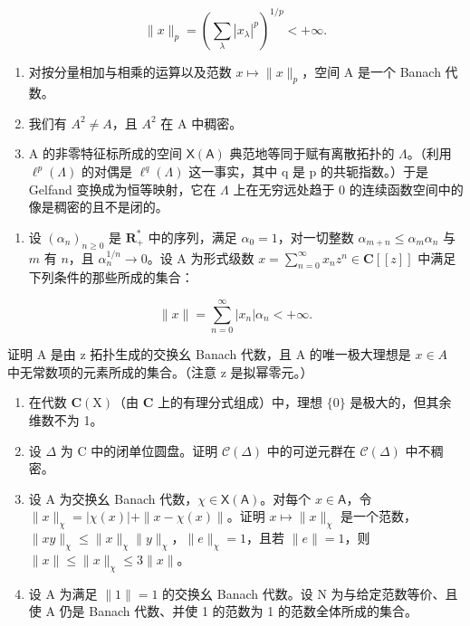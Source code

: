 \[
\| x \| _ {p} = \left(\sum_ {\lambda} | x _ {\lambda} | ^ {p}\right) ^ {1 / p} <   + \infty .
\]

\begin{enumerate}
\def\labelenumi{\alph{enumi})}
\item
  对按分量相加与相乘的运算以及范数 \(x \mapsto \| x \|_p\)，空间 A 是一个 Banach 代数。
\item
  我们有 \(A^{2} \neq A\)，且 \(A^{2}\) 在 A 中稠密。
\item
  A 的非零特征标所成的空间 \(\mathsf{X}(\mathsf{A})\) 典范地等同于赋有离散拓扑的 \(\Lambda\)。（利用 \(\ell^{p}(\Lambda)\) 的对偶是 \(\ell^{q}(\Lambda)\) 这一事实，其中 q 是 p 的共轭指数。）于是 Gelfand 变换成为恒等映射，它在 \(\Lambda\) 上在无穷远处趋于 0 的连续函数空间中的像是稠密的且不是闭的。
\end{enumerate}

\begin{enumerate}
\def\labelenumi{\arabic{enumi})}
\setcounter{enumi}{3}
\tightlist
\item
  设 \((\alpha_{n})_{n\geqslant 0}\) 是 \(\mathbf{R}_{+}^{*}\) 中的序列，满足 \(\alpha_0 = 1\)，对一切整数 \(\alpha_{m + n}\leqslant \alpha_m\alpha_n\) 与 \(m\) 有 \(n\)，且 \(\alpha_{n}^{1 / n}\to 0\)。设 A 为形式级数 \(x = \sum_{n = 0}^{\infty}x_{n}z^{n}\in \mathbf{C}[[z]]\) 中满足下列条件的那些所成的集合：
\end{enumerate}

\[
\| x \| = \sum_ {n = 0} ^ {\infty} | x _ {n} | \alpha_ {n} <   + \infty .
\]

  证明 A 是由 z 拓扑生成的交换幺 Banach 代数，且 A 的唯一极大理想是 \(x \in A\) 中无常数项的元素所成的集合。（注意 z 是拟幂零元。）

\begin{enumerate}
\def\labelenumi{\arabic{enumi})}
\setcounter{enumi}{4}
\item
  在代数 \(\mathbf{C}(\mathrm{X})\)（由 \(\mathbf{C}\) 上的有理分式组成）中，理想 \(\{0\}\) 是极大的，但其余维数不为 1。
\item
  设 \(\Delta\) 为 C 中的闭单位圆盘。证明 \(\mathcal{C}(\Delta)\) 中的可逆元群在 \(\mathcal{C}(\Delta)\) 中不稠密。
\item
  设 A 为交换幺 Banach 代数，\(\chi \in \mathsf{X}(\mathsf{A})\)。对每个 \(x \in \mathsf{A}\)，令 \(\|x\|_{\chi} = |\chi(x)| + \|x - \chi(x)\|\)。证明 \(x \mapsto \|x\|_{\chi}\) 是一个范数，\(\|xy\|_{\chi} \leqslant \|x\|_{\chi}\|y\|_{\chi}\)，\(\|e\|_{\chi} = 1\)，且若 \(\|e\| = 1\)，则 \(\|x\| \leqslant \|x\|_{\chi} \leqslant 3\|x\|\)。
\item
  设 A 为满足 \(\|1\| = 1\) 的交换幺 Banach 代数。设 N 为与给定范数等价、且使 A 仍是 Banach 代数、并使 1 的范数为 1 的范数全体所成的集合。
\end{enumerate}

